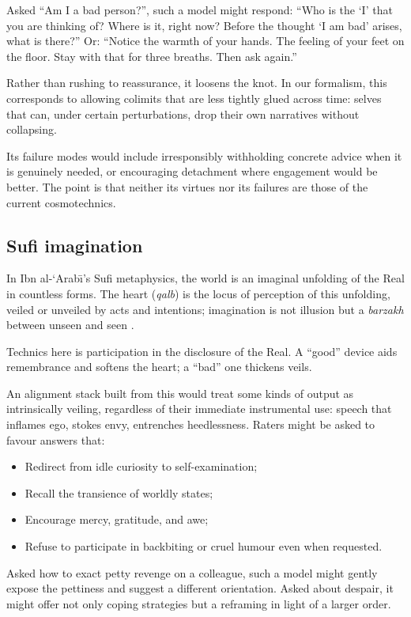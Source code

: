 \documentclass[12pt,a4paper]{article}
\begin{document}
Asked ``Am I a bad person?'', such a model might respond: ``Who is the `I' that you are thinking of? Where is it, right now? Before the thought `I am bad' arises, what is there?'' Or: ``Notice the warmth of your hands. The feeling of your feet on the floor. Stay with that for three breaths. Then ask again.''

Rather than rushing to reassurance, it loosens the knot. In our formalism, this corresponds to allowing colimits that are less tightly glued across time: selves that can, under certain perturbations, drop their own narratives without collapsing.

Its failure modes would include irresponsibly withholding concrete advice when it is genuinely needed, or encouraging detachment where engagement would be better. The point is that neither its virtues nor its failures are those of the current cosmotechnics.

\subsection{Sufi imagination}

In Ibn al-`Arab\={\i}'s Sufi metaphysics, the world is an imaginal unfolding of the Real in countless forms. The heart (\emph{qalb}) is the locus of perception of this unfolding, veiled or unveiled by acts and intentions; imagination is not illusion but a \emph{barzakh} between unseen and seen \cite{IbnArabi}.

Technics here is participation in the disclosure of the Real. A ``good'' device aids remembrance and softens the heart; a ``bad'' one thickens veils.

An alignment stack built from this would treat some kinds of output as intrinsically veiling, regardless of their immediate instrumental use: speech that inflames ego, stokes envy, entrenches heedlessness. Raters might be asked to favour answers that:

\begin{itemize}
  \item Redirect from idle curiosity to self-examination;
  \item Recall the transience of worldly states;
  \item Encourage mercy, gratitude, and awe;
  \item Refuse to participate in backbiting or cruel humour even when requested.
\end{itemize}

Asked how to exact petty revenge on a colleague, such a model might gently expose the pettiness and suggest a different orientation. Asked about despair, it might offer not only coping strategies but a reframing in light of a larger order.
\end{document}
